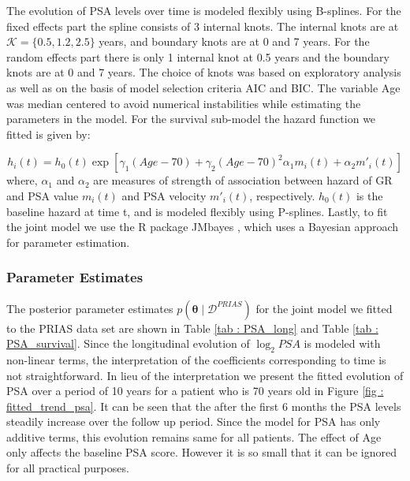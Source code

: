 The evolution of PSA levels over time is modeled flexibly using B-splines. For the fixed effects part the spline consists of 3 internal knots. The internal knots are at $\mathcal{K} =\{0.5, 1.2, 2.5\}$ years, and boundary knots are at 0 and 7 years. For the random effects part there is only 1 internal knot at 0.5 years and the boundary knots are at 0 and 7 years. The choice of knots was based on exploratory analysis as well as on the basis of model selection criteria AIC and BIC. The variable Age was median centered to avoid numerical instabilities while estimating the parameters in the model. For the survival sub-model the hazard function we fitted is given by:

\begin{equation}
\label{eq : hazard_prias}
h_i(t) = h_0(t) \exp[\gamma_1 (Age-70)  + \gamma_2 (Age-70)^2  \alpha_1 m_i(t) + \alpha_2 m'_i(t)]
\end{equation}
where, $\alpha_1$ and $\alpha_2$ are measures of strength of association between hazard of GR and PSA value $m_i(t)$ and PSA velocity $m'_i(t)$, respectively. $h_0(t)$ is the baseline hazard at time t, and is modeled flexibly using P-splines\citep{eilers1996flexible}. Lastly, to fit the joint model we use the R package JMbayes \cite{rizopoulosJMbayes}, which uses a Bayesian approach for parameter estimation.

\subsubsection{Parameter Estimates}
\label{subsec : param_estimates_jm_fit_prias}
The posterior parameter estimates $p(\boldsymbol{\theta} \mid \mathcal{D}^{PRIAS})$ for the joint model we fitted to the PRIAS data set are shown in Table \ref{tab : PSA_long} and Table \ref{tab : PSA_survival}. Since the longitudinal evolution of $\log_2 PSA$ is modeled with non-linear terms, the interpretation of the coefficients corresponding to time is not straightforward. In lieu of the interpretation we present the fitted evolution of PSA over a period of 10 years for a patient who is 70 years old in Figure \ref{fig : fitted_trend_psa}. It can be seen that the after the first 6 months the PSA levels steadily increase over the follow up period. Since the model for PSA has only additive terms, this evolution remains same for all patients. The effect of Age only affects the baseline PSA score. However it is so small that it can be ignored for all practical purposes.\\

